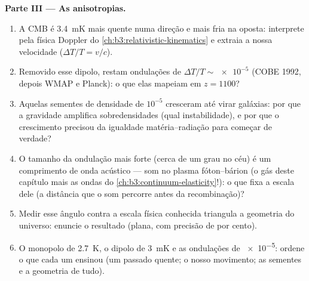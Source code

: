\begin{problem}
\medskip\noindent\textbf{Parte III --- As anisotropias.}
\begin{enumerate}[resume]
  \item A CMB é \qty{3.4}{mK} mais quente numa direção e
        mais fria na oposta: interprete pela física Doppler do
        \cref{ch:b3:relativistic-kinematics} e extraia a nossa
        velocidade ($\Delta T/T = v/c$).
  \item Removido esse dipolo, restam ondulações de $\Delta T/T \sim
        \num{e-5}$ (COBE 1992, depois WMAP e Planck): o que elas
        mapeiam em $z = 1100$?
  \item Aquelas sementes de densidade de $10^{-5}$ cresceram até virar
        galáxias: por que a gravidade amplifica sobredensidades (qual
        instabilidade), e por que o crescimento precisou da igualdade
        matéria--radiação para começar de verdade?
  \item O tamanho da ondulação mais forte (cerca de um grau no céu)
        é um comprimento de onda acústico --- som no
        plasma fóton--bárion (o gás deste capítulo mais
        as ondas do \cref{ch:b3:continuum-elasticity}!): o que fixa
        a escala dele (a distância que o som percorre antes da
        recombinação)?
  \item Medir esse ângulo contra a escala física conhecida
        triangula a geometria do universo: enuncie o
        resultado (plana, com precisão de por cento).
  \item O monopolo de \qty{2.7}{K}, o dipolo de \qty{3}{mK} e as
        ondulações de \num{e-5}: ordene o que cada um ensinou (um
        passado quente; o nosso movimento; as sementes e a geometria de tudo).
\end{enumerate}


\end{problem}
